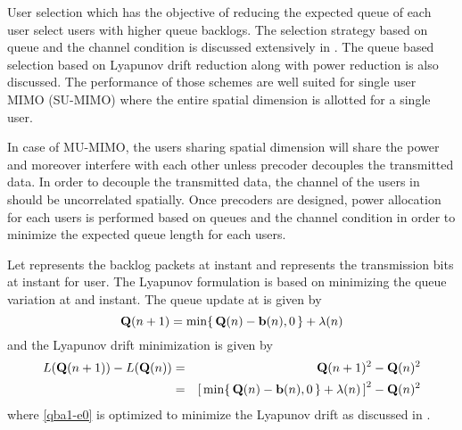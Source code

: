 
User selection which has the objective of reducing the expected queue of each user select users with higher queue backlogs. The selection strategy based on queue and the channel condition is discussed extensively in \cite{neely2012stability}. The queue based selection based on Lyapunov drift reduction along with power reduction is also discussed. The performance of those schemes are well suited for single user MIMO (SU-MIMO) where the entire spatial dimension is allotted for a single user.

In case of MU-MIMO, the users sharing spatial dimension will share the power and moreover interfere with each other unless precoder decouples the transmitted data. In order to decouple the transmitted data, the channel of the users in  should be uncorrelated spatially. Once precoders are designed, power allocation for each users is performed based on queues and the channel condition in order to minimize the expected queue length for each users.

Let  represents the backlog packets at  instant and  represents the transmission bits at  instant for  user. The Lyapunov formulation is based on minimizing the queue variation at  and  instant. The queue update at  is given by
\begin{equation}
\mathbf{Q}(n+1) = \min \lbrace \, \mathbf{Q}(n) - \mathbf{b}(n),0 \, \rbrace + \lambda(n)
\end{equation}
and the Lyapunov drift minimization is given by
\begin{eqnarray}
L(\mathbf{Q}(n + 1)) - L(\mathbf{Q}(n)) &=& \mathbf{Q}(n + 1)^2 - \mathbf{Q}(n)^2 \\
&=& \left [ \, \min \lbrace \, \mathbf{Q}(n) - \mathbf{b}(n),0 \, \rbrace + \lambda(n) \, \right ]^2 - \mathbf{Q}(n)^2
\label{qba1-e0}
\end{eqnarray}
where \eqref{qba1-e0} is optimized to minimize the Lyapunov drift as discussed in \cite{neely2010stochastic}.

